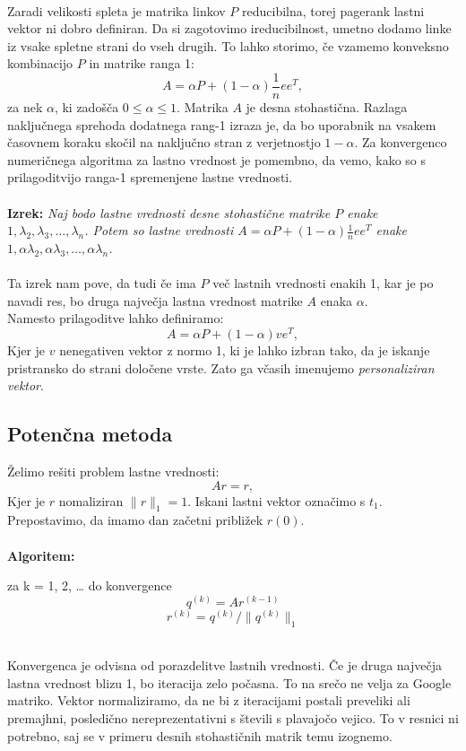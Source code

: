 \documentclass[a4paper]{article}
\begin{document}
\\Zaradi velikosti spleta je matrika linkov $P$ reducibilna, torej pagerank lastni vektor ni dobro definiran. Da si zagotovimo ireducibilnost, umetno dodamo linke iz vsake spletne strani do vseh drugih. To lahko storimo, če vzamemo konveksno kombinacijo $P$ in matrike ranga 1:
$$A=\alpha P + (1-\alpha)\frac{1}{n}ee^T,$$
za nek $\alpha$, ki zadošča $0 \leq \alpha \leq 1$. Matrika $A$ je desna stohastična. Razlaga naključnega sprehoda dodatnega rang-1 izraza je, da bo uporabnik na vsakem časovnem koraku skočil na naključno stran z verjetnostjo $1- \alpha$.
Za konvergenco numeričnega algoritma za lastno vrednost je pomembno, da vemo, kako so s prilagoditvijo ranga-1 spremenjene lastne vrednosti.\\
\\ \textbf{Izrek:} \textit{Naj bodo lastne vrednosti desne stohastične matrike $P$ enake ${1, \lambda_2, \lambda_3, … , \lambda_n}$. Potem so lastne vrednosti $A=\alpha P + (1- \alpha) \frac{1}{n}ee^T$ enake ${1, \alpha \lambda_2, \alpha \lambda_3, … , \alpha \lambda_n}$.}\\
\\
Ta izrek nam pove, da tudi če ima $P$ več lastnih vrednosti enakih 1, kar je po navadi res, bo druga največja lastna vrednost matrike $A$ enaka $\alpha$. \\
Namesto prilagoditve lahko definiramo:
$$A = \alpha P + (1- \alpha)ve^T,$$
Kjer je $v$ nenegativen vektor z normo 1, ki je lahko izbran tako, da je iskanje pristransko do strani določene vrste. Zato ga včasih imenujemo \textit{personaliziran vektor}.

\subsection{Potenčna metoda}
Želimo rešiti problem lastne vrednosti:
$$Ar = r,$$
Kjer je $r$ nomaliziran $\|r\|_1=1$. Iskani lastni vektor označimo s $t_1$. \\
Prepostavimo, da imamo dan začetni približek $r{(0)}$. \\
\\
\textbf{Algoritem:} \\
\begin{center} za k = 1, 2, … do konvergence
	$$q^{(k)} = Ar^{(k-1)}$$ 
	$$r^{(k)} = q^{(k)}/ \|q^{(k)}\|_1$$ \\
\end{center}
Konvergenca je odvisna od porazdelitve lastnih vrednosti. Če je druga največja lastna vrednost blizu 1, bo iteracija zelo počasna. To na srečo ne velja za Google matriko. Vektor normaliziramo, da ne bi z iteracijami postali preveliki ali premajhni, posledično nereprezentativni s števili s plavajočo vejico. To v resnici ni potrebno, saj se v primeru desnih stohastičnih matrik temu izognemo.
\end{document}

